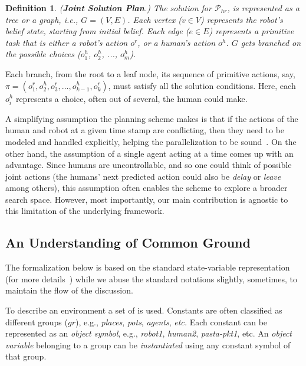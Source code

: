 \documentclass[letterpaper]{article} %
\newtheorem{definition}{Definition}
\begin{document}
\begin{definition} \label{def:joint-sol-plan}
(\textbf{Joint Solution Plan}.) 
{The solution for $\mathcal{P}_{hr}$, is represented as a tree or a graph, i.e., $G=(V,E)$. Each vertex ($v \in V$) represents the robot's belief state, starting from initial belief. Each edge ($e \in E$) represents a primitive task that is either a robot's action $o^{r}$, or a human's action $o^{h}$. $G$ gets branched on the possible choices ($o^{h}_1$, $o^{h}_2$, ..., $o^{h}_m$). 
}  
\end{definition}

Each branch, from the root to a leaf node, its sequence of primitive actions, say,  $\pi=(o_1^r,o_2^h,o_3^r,...,o_{k-1}^h,o_k^r)$, must satisfy all the solution conditions. 
Here, each $o_i^h$ represents a choice, often out of several, the human could make.

A simplifying assumption the planning scheme makes is that if the actions of the human and robot at a given time stamp are conflicting, then they need to be modeled and handled explicitly, helping the parallelization to be sound~\cite{CrosbyJR14,ShekharB20}.
On the other hand, the assumption of a single agent acting at a time comes up with an advantage. Since humans are uncontrollable, and so one could think of possible joint actions (the humans' next predicted action could also be \textit{delay} or \textit{leave} among others), this assumption often enables the scheme to explore a broader search space. 
However, most importantly, our main contribution is agnostic to this limitation of the underlying framework.

\subsection{An Understanding of Common Ground}
The formalization below is based on the standard state-variable representation (for more details~\cite{naubooks0014222}) while we abuse the standard notations slightly, sometimes, to maintain the flow of the discussion.

To describe an environment a set of  is used. 
Constants are often classified as different groups ($gr$), e.g., \textit{places}, \textit{pots}, \textit{agents}, \textit{etc.} 
Each constant can be represented as an \textit{object symbol}, e.g., \textit{robot1}, \textit{human2}, \textit{pasta-pkt1}, etc. 
An \textit{object variable} belonging to a group can be \textit{instantiated} using any constant symbol of that group.
\end{document}
